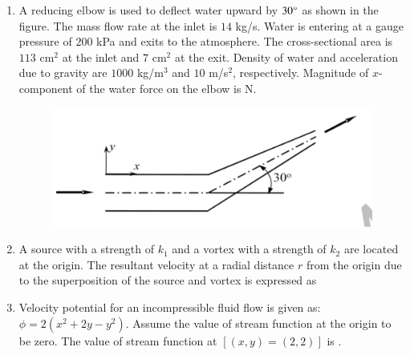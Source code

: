 \documentclass[a4paper,10pt]{article}
\begin{document}
\begin{enumerate}
    \hfill{}

    \item A reducing elbow is used to deflect water upward by $30\degree$ as shown in the figure. The mass flow rate at the inlet is $14$ kg/s. Water is entering at a gauge pressure of $200$ kPa and exits to the atmosphere. The cross-sectional area is $113$ cm$^2$ at the inlet and $7$ cm$^2$ at the exit. Density of water and acceleration due to gravity are $1000$ kg/m$^3$ and $10$ m/s$^2$, respectively. Magnitude of $x$-component of the water force on the elbow is \underline{\hspace{2cm}} N.
    \begin{figure}[H] \centering \includegraphics[width=0.6\columnwidth]{Bq15.png} \caption*{} \label{fig:q15_fluid} \end{figure}
    
    \hfill{}

    \item A source with a strength of $k_1$ and a vortex with a strength of $k_2$ are located at the origin. The resultant velocity at a radial distance $r$ from the origin due to the superposition of the source and vortex is expressed as
    
    \hfill{}
    \begin{enumerate}
    \end{enumerate}

    \item Velocity potential for an incompressible fluid flow is given as: $\phi = 2(x^2+2y-y^2)$. Assume the value of stream function at the origin to be zero. The value of stream function at $[(x,y) = (2,2)]$ is \underline{\hspace{2cm}}.
    

\end{enumerate}
\end{document}
